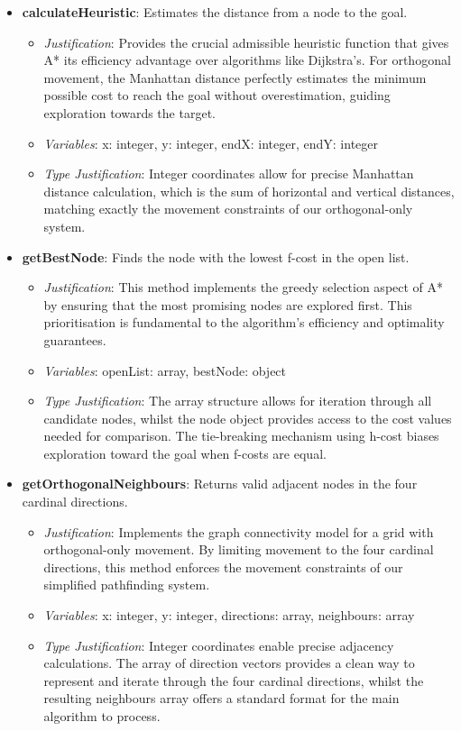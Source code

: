 \begin{itemize}
\item \textbf{calculateHeuristic}: Estimates the distance from a node to the goal. \begin{itemize} \item \textit{Justification}: Provides the crucial admissible heuristic function that gives A* its efficiency advantage over algorithms like Dijkstra's. For orthogonal movement, the Manhattan distance perfectly estimates the minimum possible cost to reach the goal without overestimation, guiding exploration towards the target. \item \textit{Variables}: x: integer, y: integer, endX: integer, endY: integer \item \textit{Type Justification}: Integer coordinates allow for precise Manhattan distance calculation, which is the sum of horizontal and vertical distances, matching exactly the movement constraints of our orthogonal-only system. \end{itemize}

\newpage

\item \textbf{getBestNode}: Finds the node with the lowest f-cost in the open list. \begin{itemize} \item \textit{Justification}: This method implements the greedy selection aspect of A* by ensuring that the most promising nodes are explored first. This prioritisation is fundamental to the algorithm's efficiency and optimality guarantees. \item \textit{Variables}: openList: array, bestNode: object \item \textit{Type Justification}: The array structure allows for iteration through all candidate nodes, whilst the node object provides access to the cost values needed for comparison. The tie-breaking mechanism using h-cost biases exploration toward the goal when f-costs are equal. \end{itemize}

\item \textbf{getOrthogonalNeighbours}: Returns valid adjacent nodes in the four cardinal directions. \begin{itemize} \item \textit{Justification}: Implements the graph connectivity model for a grid with orthogonal-only movement. By limiting movement to the four cardinal directions, this method enforces the movement constraints of our simplified pathfinding system. \item \textit{Variables}: x: integer, y: integer, directions: array, neighbours: array \item \textit{Type Justification}: Integer coordinates enable precise adjacency calculations. The array of direction vectors provides a clean way to represent and iterate through the four cardinal directions, whilst the resulting neighbours array offers a standard format for the main algorithm to process. \end{itemize}


\end{itemize}

